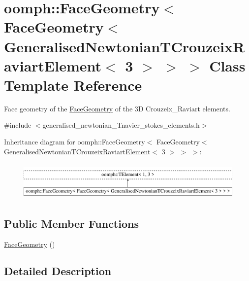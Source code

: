\hypertarget{classoomph_1_1FaceGeometry_3_01FaceGeometry_3_01GeneralisedNewtonianTCrouzeixRaviartElement_3_013_01_4_01_4_01_4}{}\section{oomph\+:\+:Face\+Geometry$<$ Face\+Geometry$<$ Generalised\+Newtonian\+T\+Crouzeix\+Raviart\+Element$<$ 3 $>$ $>$ $>$ Class Template Reference}
\label{classoomph_1_1FaceGeometry_3_01FaceGeometry_3_01GeneralisedNewtonianTCrouzeixRaviartElement_3_013_01_4_01_4_01_4}


Face geometry of the \hyperlink{classoomph_1_1FaceGeometry}{Face\+Geometry} of the 3D Crouzeix\+\_\+\+Raviart elements.  




{\ttfamily \#include $<$generalised\+\_\+newtonian\+\_\+\+Tnavier\+\_\+stokes\+\_\+elements.\+h$>$}

Inheritance diagram for oomph\+:\+:Face\+Geometry$<$ Face\+Geometry$<$ Generalised\+Newtonian\+T\+Crouzeix\+Raviart\+Element$<$ 3 $>$ $>$ $>$\+:\begin{figure}[H]
\begin{center}
\leavevmode
\includegraphics[height=1.944445cm]{classoomph_1_1FaceGeometry_3_01FaceGeometry_3_01GeneralisedNewtonianTCrouzeixRaviartElement_3_013_01_4_01_4_01_4}
\end{center}
\end{figure}
\subsection*{Public Member Functions}
\begin{DoxyCompactItemize}
\item 
\hyperlink{classoomph_1_1FaceGeometry_3_01FaceGeometry_3_01GeneralisedNewtonianTCrouzeixRaviartElement_3_013_01_4_01_4_01_4_a6b071928cc28dfc1203dd24cdd341745}{Face\+Geometry} ()
\end{DoxyCompactItemize}


\subsection{Detailed Description}
